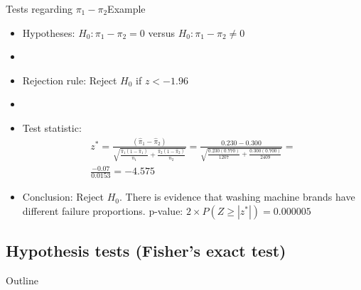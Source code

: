 \documentclass[xcolor=dvipsnames]{beamer}
\begin{document}
\begin{frame}{Tests regarding $\pi_1 - \pi_2$}{Example}
	\begin{itemize}
		\item Hypotheses: $H_0: \pi_1-\pi_2 = 0$ versus $H_0: \pi_1-\pi_2 \neq 0$  \pause
		\item[]
		\item Rejection rule: Reject $H_0$ if $z < -1.96$  \pause
		\item[]
		\item Test statistic:  \pause
		\begin{gather*}
			z^*=\frac{(\hat{\pi}_1 - \hat{\pi}_2)}{\sqrt{\frac{\hat{\pi}_1 (1-\hat{\pi}_1)}{n_1}+\frac{\hat{\pi}_2 (1-\hat{\pi}_2)}{n_2}}} = \frac{0.230 - 0.300}{\sqrt{\frac{0.230 (0.770)}{1207}+\frac{0.300 (0.700)}{2409}}} =  \\
			\frac{-0.07}{0.0153} = -4.575
		\end{gather*} \pause
		\item Conclusion: Reject $H_0$. There is evidence that washing machine brands have different failure proportions. p-value: $2\times P(Z \geq |z^*|) =0.000005$ 
	\end{itemize}
\end{frame}

\subsection{Hypothesis tests (Fisher's exact test)}

\begin{frame}{Outline}
	\tableofcontents[currentsection,subsectionstyle=show/shaded/hide]
\end{frame}
\end{document}
